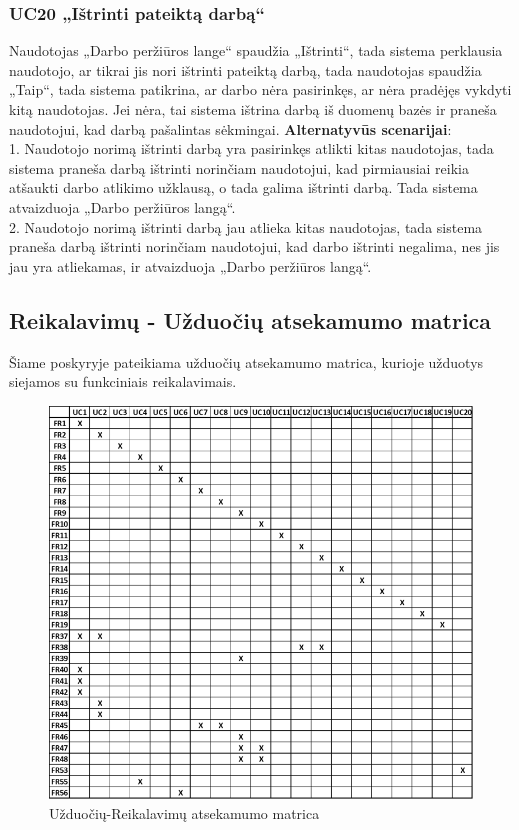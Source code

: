\documentclass{VUMIFPSbakalaurinis}
\begin{document}
\subsubsection{UC20 „Ištrinti pateiktą darbą“}
Naudotojas „Darbo peržiūros lange“ spaudžia „Ištrinti“, tada sistema perklausia naudotojo, ar tikrai jis nori ištrinti pateiktą darbą, tada naudotojas spaudžia „Taip“, tada sistema patikrina, ar darbo nėra pasirinkęs, ar nėra pradėjęs vykdyti kitą naudotojas. Jei nėra, tai sistema ištrina darbą iš duomenų bazės ir praneša naudotojui, kad darbą pašalintas sėkmingai.
\textbf{Alternatyvūs scenarijai}: \\
1. Naudotojo norimą ištrinti darbą yra pasirinkęs atlikti kitas naudotojas, tada sistema praneša darbą ištrinti norinčiam naudotojui, kad pirmiausiai reikia atšaukti darbo atlikimo užklausą, o tada galima ištrinti darbą. Tada sistema atvaizduoja „Darbo peržiūros langą“.\\ 
2. Naudotojo norimą ištrinti darbą jau atlieka kitas naudotojas, tada sistema praneša darbą ištrinti norinčiam naudotojui, kad darbo ištrinti negalima, nes jis jau yra atliekamas, ir atvaizduoja „Darbo peržiūros langą“.
\subsection{Reikalavimų - Užduočių atsekamumo matrica}
Šiame poskyryje pateikiama užduočių atsekamumo matrica, kurioje užduotys siejamos su funkciniais reikalavimais.
\begin{figure}[H]
    \centering
    \includegraphics[scale=0.8]{img/UC-matrix}
    \caption{Užduočių-Reikalavimų atsekamumo matrica}
    \label{img:uc-matrix}
\end{figure}
\end{document}
